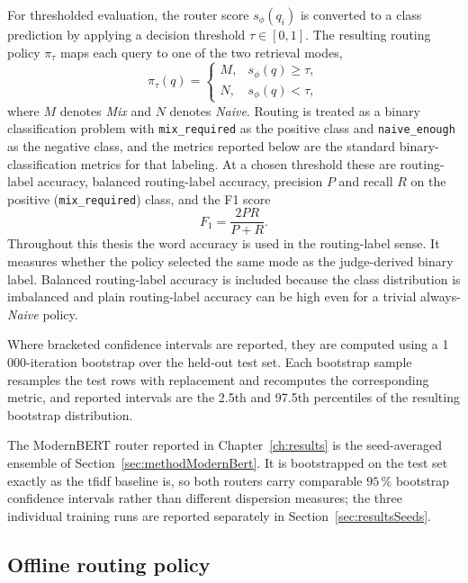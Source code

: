 \documentclass[english, bibtex]{kththesis}               %
\numberwithin{listing}{chapter}
\begin{document}
For thresholded evaluation, the router score \(s_\phi(q_i)\) is converted to a class prediction by applying a decision threshold \(\tau \in [0, 1]\). The resulting routing policy \(\pi_\tau\) maps each query to one of the two retrieval modes,
\begin{equation}
\label{eq:routingPolicy}
\pi_\tau(q) =
\begin{cases}
M, & s_\phi(q) \geq \tau,\\
N, & s_\phi(q) < \tau,
\end{cases}
\end{equation}
where \(M\) denotes \emph{Mix} and \(N\) denotes \emph{Naive}. Routing is treated as a binary classification problem with \texttt{mix\_required} as the positive class and \texttt{naive\_enough} as the negative class, and the metrics reported below are the standard binary-classification metrics for that labeling. At a chosen threshold these are routing-label accuracy, balanced routing-label accuracy, precision \(P\) and recall \(R\) on the positive (\texttt{mix\_required}) class, and the F1 score
\begin{equation}
\label{eq:f1}
F_1 = \frac{2 P R}{P + R}.
\end{equation}
Throughout this thesis the word accuracy is used in the routing-label sense. It measures whether the policy selected the same mode as the judge-derived binary label. Balanced routing-label accuracy is included because the class distribution is imbalanced and plain routing-label accuracy can be high even for a trivial always-\emph{Naive} policy.

Where bracketed confidence intervals are reported, they are computed using a 1\,000-iteration bootstrap over the held-out test set. Each bootstrap sample resamples the test rows with replacement and recomputes the corresponding metric, and reported intervals are the 2.5th and 97.5th percentiles of the resulting bootstrap distribution.

The ModernBERT router reported in Chapter~\ref{ch:results} is the seed-averaged ensemble of Section~\ref{sec:methodModernBert}. It is bootstrapped on the test set exactly as the \gls{tfidf} baseline is, so both routers carry comparable $95\,\%$ bootstrap confidence intervals rather than different dispersion measures; the three individual training runs are reported separately in Section~\ref{sec:resultsSeeds}.

\subsection{Offline routing policy}
\label{sec:methodOfflinePolicy}
\end{document}
